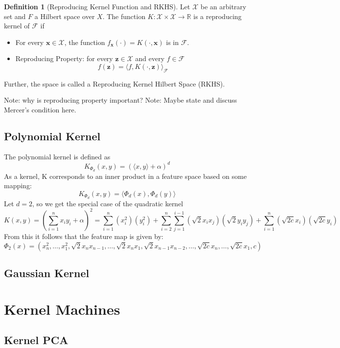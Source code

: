 \documentclass[12pt]{article}
\theoremstyle{definition}
\newtheorem{definition}{Definition}[section]
\theoremstyle{remark}
\begin{document}
\begin{definition}[Reproducing Kernel Function and RKHS]
  Let \(\mathcal{X}\) be an arbitrary set and \(F\) a Hilbert space over \(X\). The function \(K: \mathcal{X} \times \mathcal{X} \rightarrow \mathbb{R}\) is a reproducing kernel of \(\mathcal{F}\) if
  \begin{itemize}
    \item For every \(\mathbf{x} \in \mathcal{X}\), the function \(f_{\mathbf{x}}(\cdot) = K(\cdot, \mathbf{x})\) is in \(\mathcal{F}\).
    \item Reproducing Property: for every \(\mathbf{z} \in \mathcal{X}\) and every \(f \in \mathcal{F}\)
      \[
        f(\mathbf{z}) = {\langle f, K(\cdot, \mathbf{z}) \rangle}_{\mathcal{F}}
      \]
  \end{itemize}
  Further, the space is called a Reproducing Kernel Hilbert Space (RKHS).
\end{definition}

Note: why is reproducing property important?
Note: Maybe state and discuss Mercer's condition here.

\subsection{Polynomial Kernel}
The polynomial kernel is defined as
\[
  K_{\Phi_{d}}(x, y) = {(\langle x,y \rangle + \alpha)}^{d}
\]
As a kernel, K corresponds to an inner product in a feature space based on some mapping:
\[
  K_{\Phi_{d}}(x, y) = \langle \Phi_{d}(x), \Phi_{d}(y) \rangle
\]
Let \( d=2 \), so we get the special case of the quadratic kernel
\[
  K(x, y) = (\sum_{i=1}^{n} x_{i}y_{i} + \alpha)^{2} = \sum_{i=1}^{n}(x_{i}^{2})(y_{i}^{2}) + \sum_{i=2}^{n}\sum_{j=1}^{i-1}(\sqrt{2}x_{i}x_{j})(\sqrt{2}y_{i}y_{j}) + \sum_{i=1}^{n}(\sqrt{2c}x_{i})(\sqrt{2c}y_{i})
\]
From this it follows that the feature map is given by:
\[
  \Phi_{2}(x) = (x_{n}^{2},\dots,x_{1}^{2},\sqrt{2}x_{n}x_{n-1},\dots,\sqrt{2}x_{n}x_{1},\sqrt{2}x_{n-1}x_{n-2},\dots,\sqrt{2c}x_{n},\dots,\sqrt{2c}x_{1},c)
\]


\subsection{Gaussian Kernel}

\section{Kernel Machines}
\subsection{Kernel PCA}
\end{document}
